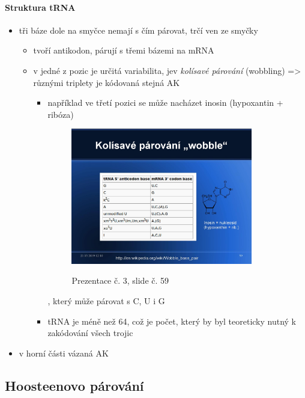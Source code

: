 \documentclass[DIV=8]{scrreprt}
\begin{document}
\paragraph{Struktura tRNA}
\begin{itemize}[nosep]
    \item tři báze dole na smyčce nemají s čím párovat, trčí ven ze smyčky
\begin{itemize}[nosep]
    \item tvoří antikodon, párují s třemi bázemi na mRNA
    \item v jedné z pozic je určitá variabilita, jev \emph{kolísavé párování} (wobbling) => různými triplety je kódovaná stejná AK
\begin{itemize}[nosep]
    \item například ve třetí pozici se může nacházet inosin (hypoxantin + ribóza) \begin{figure}
    \caption{Prezentace č. 3, slide č. 59}
    \includegraphics[width=0.85\textwidth]{slides-3/slide-59.jpg}
    \centering
    \label{slides-3-slide-59}
\end{figure}
, který může párovat s C, U i G
    \item tRNA je méně než 64, což je počet, který by byl teoreticky nutný k zakódování všech trojic
\end{itemize}

\end{itemize}

    \item v horní části vázaná AK
\end{itemize}



\subsection{Hoosteenovo párování} \label{Hoosteenovo párování}
\end{document}
